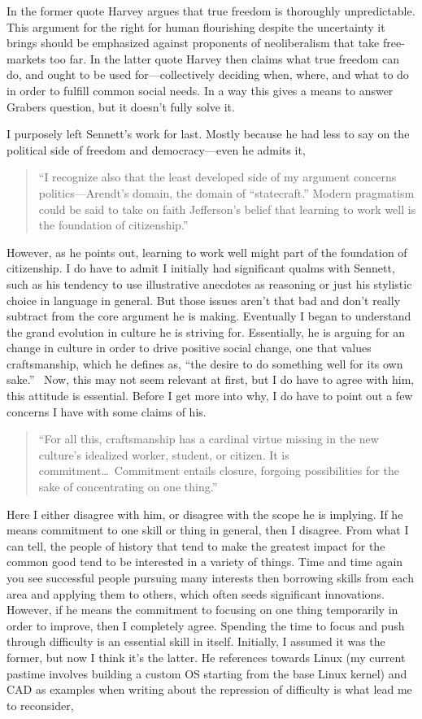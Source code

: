 \documentclass[12pt,a4paper]{article}
\begin{document}
In the former quote Harvey argues that true freedom is thoroughly unpredictable. This argument for the right for human flourishing despite the uncertainty it brings should be emphasized against proponents of neoliberalism that take free-markets too far. In the latter quote Harvey then claims what true freedom can do, and ought to be used for---collectively deciding when, where, and what to do in order to fulfill common social needs. In a way this gives a means to answer Grabers question, but it doesn't fully solve it. 

I purposely left Sennett's work for last. Mostly because he had less to say on the political side of freedom and democracy---even he admits it,
\begin{quote}\color{G-Moon}
``I recognize also that the least developed side of my argument concerns politics—Arendt’s domain, the domain of ``statecraft.'' Modern
pragmatism could be said to take on faith Jefferson’s belief that learning to work well is the foundation of citizenship.''~\cite{craft}
\end{quote}
However, as he points out, learning to work well might part of the foundation of citizenship. I do have to admit I initially had significant qualms with Sennett, such as his tendency to use illustrative anecdotes as reasoning or just his stylistic choice in language in general. But those issues aren't that bad and don't really subtract from the core argument he is making. Eventually I began to understand the grand evolution in culture he is striving for. Essentially, he is arguing for an change in culture in order to drive positive social change, one that values craftsmanship, which he defines as, ``the desire to do something well for its own sake.''~\cite{craft} Now, this may not seem relevant at first, but I do have to agree with him, this attitude is essential. Before I get more into why, I do have to point out a few concerns I have with some claims of his.
\begin{quote}\color{G-Moon}
   ``For all this, craftsmanship has a cardinal virtue missing in the new culture’s idealized worker, student, or citizen. It is commitment\ldots~Commitment entails closure, forgoing possibilities for the sake of concentrating on one thing.''~\cite{craft}
\end{quote}
Here I either disagree with him, or disagree with the scope he is implying. If he means commitment to one skill or thing in general, then I disagree. From what I can tell, the people of history that tend to make the greatest impact for the common good tend to be interested in a variety of things. Time and time again you see successful people pursuing many interests then borrowing skills from each area and applying them to others, which often seeds significant innovations. However, if he means the commitment to focusing on one thing temporarily in order to improve, then I completely agree. Spending the time to focus and push through difficulty is an essential skill in itself. Initially, I assumed it was the former, but now I think it's the latter. He references towards Linux (my current pastime involves building a custom OS starting from the base Linux kernel) and CAD as examples when writing about the repression of difficulty is what lead me to reconsider,
\end{document}
